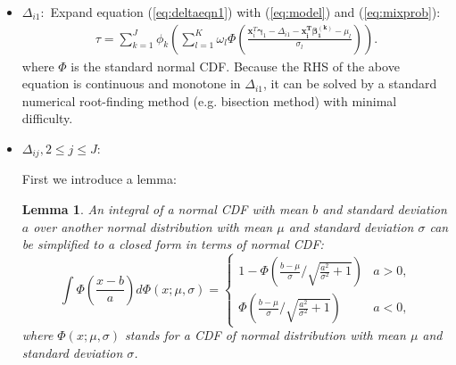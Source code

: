 \documentclass[12pt]{article}
\newtheorem{lem}[thm]{Lemma} \newtheorem{pps}[thm]{Proposition}
\begin{document}
\begin{itemize}
\item \textbf{$\Delta_{i1}: $} Expand equation (\ref{eq:deltaeqn1}) with (\ref{eq:model}) and (\ref{eq:mixprob}):
  \begin{align*}
    \tau = \sum_{k = 1}^J \phi_k \left( \sum_{l = 1}^{K} \omega_{l} \Phi \left( \frac{\bm x_{i}^T
        \bm \gamma_1 - \Delta_{i1} -\bm{x_i^T \beta_1^{(k)}} - \mu_{l}}{ \sigma_{l} } \right) \right).
  \end{align*}
  where $\Phi$ is the standard normal CDF.
  Because the RHS of the above equation
  is continuous and monotone in $\Delta_{i1}$, it can be solved by a
  standard numerical root-finding method (e.g. bisection method) with
  minimal difficulty.

\item \textbf{$\Delta_{ij}, 2\leq j \leq J: $}

  First we introduce a lemma:
  \begin{lem}\label{ch3:sec:lemma}
    An integral of a normal CDF with mean $b$ and standard deviation
    $a$ over another normal distribution with mean $\mu$ and standard
    deviation $\sigma$ can be simplified to a closed form in terms of
    normal CDF:
    \begin{displaymath}
      \int \Phi \left( \frac{x-b}{a} \right) d\Phi(x; \mu, \sigma)  =
      \begin{cases}
        1- \Phi \left( \frac{b-\mu}{\sigma} \big /
          \sqrt{\frac{a^2}{\sigma^2}+1} \right) & a > 0, \\
        \Phi \left( \frac{b-\mu}{\sigma} \big /
          \sqrt{\frac{a^2}{\sigma^2}+1} \right) & a < 0,
      \end{cases}
    \end{displaymath}
    where $\Phi(x; \mu, \sigma)$ stands for a CDF of normal
    distribution with mean $\mu$ and standard deviation $\sigma$.
  \end{lem}


\end{itemize}
\end{document}
